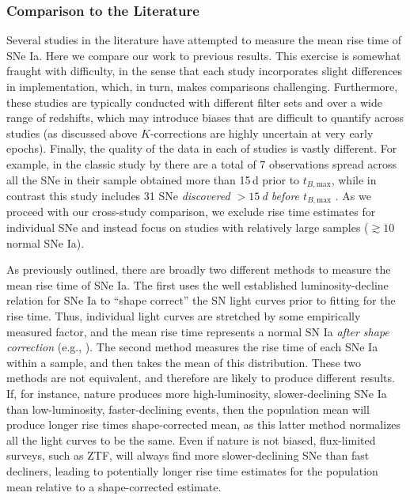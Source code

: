 \documentclass[twocolumn]{./aastex63}
\newcommand{\tbmax}{$t_{B,\mathrm{max}}$}
\begin{document}
\subsubsection{Comparison to the Literature}

Several studies in the literature have attempted to measure the mean rise time
of SNe Ia. Here we compare our work to previous results. This exercise is
somewhat fraught with difficulty, in the sense that each study incorporates
slight differences in implementation, which, in turn, makes comparisons
challenging. Furthermore, these studies are typically conducted with different
filter sets and over a wide range of redshifts, which may introduce biases that
are difficult to quantify across studies (as discussed above $K$-corrections are
highly uncertain at very early epochs). Finally, the quality of the data in each
of studies is vastly different. For example, in the classic study by
\citet{Riess99a} there are a total of 7 observations spread across all the SNe
in their sample obtained more than 15\,d prior to \tbmax, while in contrast this
study includes 31 SNe \textit{discovered $> 15$\,d before \tbmax} \citep{Yao19}.
As we proceed with our cross-study comparison, we exclude rise time estimates
for individual SNe and instead focus on studies with relatively large samples
($\gtrsim 10$ normal SNe Ia).

As previously outlined, there are broadly two different methods to measure the
mean rise time of SNe Ia. The first uses the well established luminosity-decline
relation for SNe Ia \citep{Phillips93} to ``shape correct'' the SN light curves
prior to fitting for the rise time. Thus, individual light curves are stretched
by some empirically measured factor, and the mean rise time represents a normal
SN Ia \textit{after shape correction} (e.g.,
\citealt{Riess99a,Conley06,Hayden10,Ganeshalingam11}). The second method
measures the rise time of each SNe Ia within a sample, and then takes the mean
of this distribution. These two methods are not equivalent, and therefore are
likely to produce different results. If, for instance, nature produces more
high-luminosity, slower-declining SNe Ia than low-luminosity, faster-declining
events, then the population mean will produce longer rise times shape-corrected
mean, as this latter method normalizes all the light curves to be the same. Even
if nature is not biased, flux-limited surveys, such as ZTF, will always find
more slower-declining SNe than fast decliners, leading to potentially longer
rise time estimates for the population mean relative to a shape-corrected
estimate.
\end{document}
